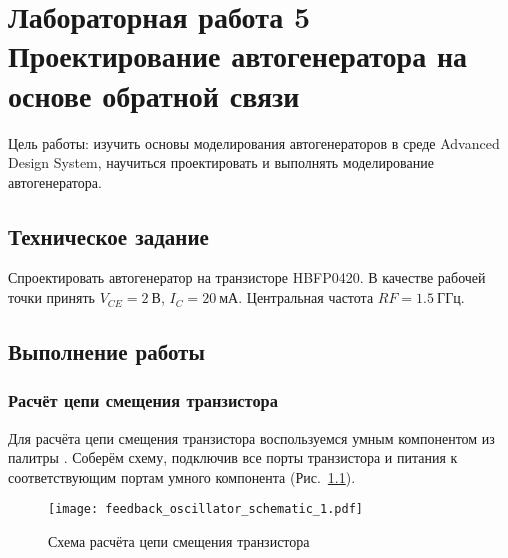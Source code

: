\chapter{Лабораторная работа 5 \\
Проектирование автогенератора на основе обратной связи}

Цель работы: изучить основы моделирования автогенераторов в среде Advanced Design System, научиться проектировать и выполнять моделирование автогенератора.

\section{Техническое задание}

Спроектировать автогенератор на транзисторе HBFP0420.
В качестве рабочей точки принять $V_{CE} = 2~\text{В}$, $I_C = 20~\text{мА}$.
Центральная частота $RF = 1.5~\text{ГГц}$.

\section{Выполнение работы}

\subsection{Расчёт цепи смещения транзистора}

Для расчёта цепи смещения транзистора воспользуемся умным компонентом  из палитры .
Соберём схему, подключив все порты транзистора и питания к соответствующим портам умного компонента (Рис.~\ref{fig:feedback_oscillator_schematic_1}).

\begin{figure}[!ht]
    \centering
    \texttt{[image: feedback\_oscillator\_schematic\_1.pdf]}
    \caption{Схема расчёта цепи смещения транзистора}%
    \label{fig:feedback_oscillator_schematic_1}
\end{figure}


